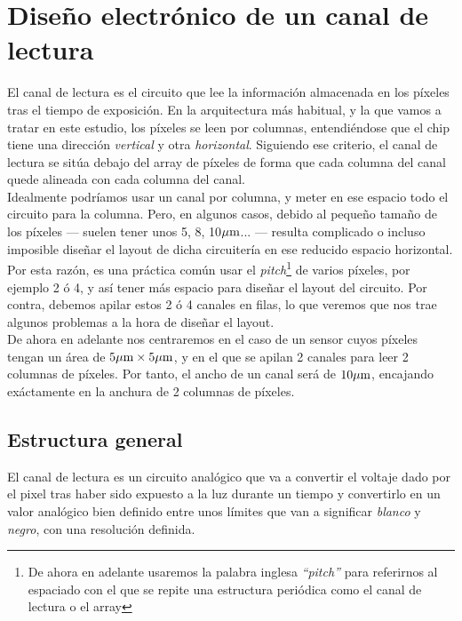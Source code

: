 \chapter{Diseño electrónico de un canal de lectura}\label{cap:ro_sch}

El canal de lectura es el circuito que lee la información almacenada en los píxeles
tras el tiempo de exposición.
En la arquitectura más habitual, y la que vamos a tratar en este estudio, los
píxeles se leen por columnas, entendiéndose que el chip tiene una dirección
\textit{vertical} y otra \textit{horizontal}. Siguiendo ese criterio, el canal de lectura se
sitúa debajo del array de píxeles de forma que cada columna del canal quede alineada
con cada columna del canal.\\

Idealmente podríamos usar un canal por columna, y meter en ese espacio todo el circuito
para la columna. Pero, en algunos casos, debido al pequeño tamaño de los píxeles
--- suelen tener unos 5, 8, 10$\mu\text{m}$... --- resulta complicado o incluso imposible diseñar el
layout de dicha circuitería en ese reducido espacio horizontal.
Por esta razón, es una práctica común usar el \textit{pitch}\footnote{De ahora en adelante
usaremos la palabra inglesa \textit{``pitch''} para referirnos al espaciado con el
que se repite una estructura periódica como el canal de lectura o el array}
de varios píxeles, por
ejemplo 2 ó 4, y así tener más espacio para diseñar el layout del circuito. Por contra,
debemos apilar estos 2 ó 4 canales en filas, lo que veremos que nos trae algunos
problemas a la hora de diseñar el layout.\\

De ahora en adelante nos centraremos en el caso de un sensor cuyos píxeles tengan
un área de $5\mu\text{m} \times 5\mu\text{m}$, y en el que se apilan 2 canales para leer 2
columnas de píxeles. Por tanto, el ancho de un canal será de $10\mu\text{m}$, encajando
exáctamente en la anchura de 2 columnas de píxeles.\\

\section{Estructura general}\label{cap:ro_sch_estructura}

El canal de lectura es un circuito analógico que va a convertir el voltaje
dado por el pixel tras haber sido expuesto a la luz durante un tiempo y
convertirlo en un valor analógico bien definido entre unos límites que van a
significar \textit{blanco} y \textit{negro}, con una resolución definida.\\

